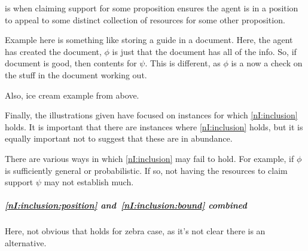 \begin{note}[\asso{}]
  \asso{} is when claiming support for some proposition ensures the agent is in a position to appeal to some distinct collection of resources for some other proposition.

  \begin{illustration}
    Example here is something like storing a guide in a document.
    Here, the agent has created the document, \(\phi\) is just that the document has all of the info.
    So, if document is good, then contents for \(\psi\).
    This is different, as \(\phi\) is a now a check on the stuff in the document working out.
  \end{illustration}

  Also, ice cream example from above.
\end{note}

\begin{note}
  Finally, the illustrations given have focused on instances for which \ref{nI:inclusion} holds.
  It is important that there are instances where \ref{nI:inclusion} holds, but it is equally important not to suggest that these are in abundance.
\end{note}

\begin{note}
  There are various ways in which \ref{nI:inclusion} may fail to hold.
  For example, if \(\phi\) is sufficiently general or probabilistic.
  If so, not having the resources to claim support \(\psi\) may not establish much.
\end{note}

\subparagraph{\ref{nI:inclusion:position} and~\ref{nI:inclusion:bound} combined}

\begin{note}
  Here, not obvious that holds for zebra case, as it's not clear there is an alternative.
\end{note}

